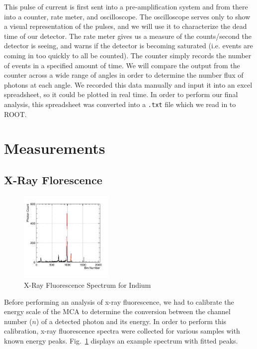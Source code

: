 \documentclass[%
 reprint,
 amsmath,amssymb,
 aps,
 pra,
]{revtex4-1}
\begin{document}
This pulse of current is first sent into a pre-amplification system and from there into a counter, rate meter, and oscilloscope. The oscilloscope serves only to show a visual representation of the pulses, and we will use it to characterize the dead time of our detector. The rate meter gives us a measure of the counts/second the detector is seeing, and warns if the detector is becoming saturated (i.e. events are coming in too quickly to all be counted). The counter simply records the number of events in a specified amount of time. We will compare the output from the counter across a wide range of angles in order to determine the number flux of photons at each angle. We recorded this data manually and input it into an excel spreadsheet, so it could be plotted in real time. In order to perform our final analysis, this spreadsheet was converted into a \verb|.txt| file which we read in to ROOT.

\section{Measurements}

\subsection{X-Ray Florescence}

\begin{figure}[H]
	\centering
	\includegraphics[width=0.4\textwidth]{InBinnedSpectrum.png}
	\caption{X-Ray Fluorescence Spectrum for Indium}
	\label{Fig:InXRFSpec}
\end{figure}

Before performing an analysis of x-ray fluorescence, we had to calibrate the energy scale of the MCA to determine the conversion between the channel number ($n$) of a detected photon and its energy. In order to perform this calibration, x-ray fluorescence spectra were collected for various samples with known energy peaks. Fig.~\ref{Fig:InXRFSpec} displays an example spectrum with fitted peaks.
\end{document}

